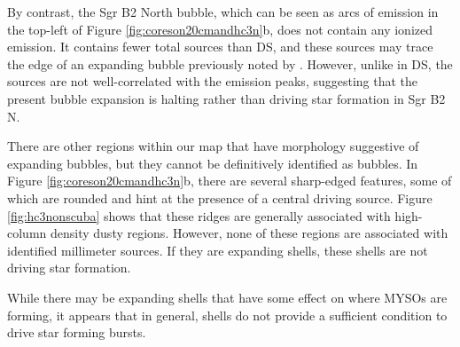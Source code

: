 \documentclass[twocolumn]{aastex61}
\begin{document}
By contrast, the Sgr B2 North bubble, which can be seen as arcs of
\cyanoacetylene emission in the top-left of Figure
\ref{fig:coreson20cmandhc3n}b, does not contain any ionized emission.  It
contains fewer total sources than DS, and these sources may trace the edge of
an expanding bubble previously noted by \citet{de-Vicente1997a}.  However,
unlike in DS, the sources are not well-correlated with the \cyanoacetylene
emission peaks, suggesting that the present bubble expansion is halting rather
than driving star formation in Sgr B2 N.

There are other regions within our map that have morphology suggestive of
expanding bubbles, but they cannot be definitively identified as bubbles.  In
Figure \ref{fig:coreson20cmandhc3n}b, there are several sharp-edged
\cyanoacetylene features, some of which are rounded and hint at the presence of
a central driving source. Figure \ref{fig:hc3nonscuba} shows that these ridges
are generally associated with high-column density dusty regions.  However, none
of these regions are associated with identified millimeter sources.  If they
are expanding shells, these shells are not driving star formation.

% 



While there may be expanding shells that have some effect on where MYSOs are
forming, it appears that in general, shells do not provide a sufficient
condition to drive star forming bursts.
\end{document}
